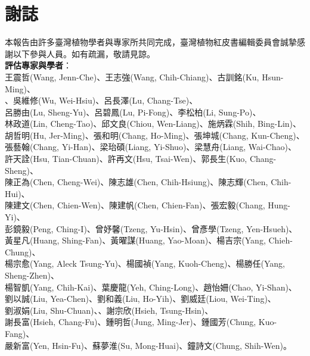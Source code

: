 \chapter{謝誌}

\linespread{1.1}\selectfont
\begin{Kai}
本報告由許多臺灣植物學者與專家所共同完成，臺灣植物紅皮書編輯委員會誠摯感謝以下參與人員。如有疏漏，敬請見諒。 \\

\noindent \textbf{評估專家與學者}：\\
\noindent 王震哲(Wang, Jenn-Che)、王志強(Wang, Chih-Chiang)、古訓銘(Ku, Hsun-Ming)、\\
、吳維修(Wu, Wei-Hsiu)、呂長澤(Lu, Chang-Tse)、\\
呂勝由(Lu, Sheng-Yu)、呂碧鳳(Lu, Pi-Fong)、李松柏(Li, Sung-Po)、\\
林政道(Lin, Cheng-Tao)、邱文良(Chiou, Wen-Liang)、施炳霖(Shih, Bing-Lin)、\\
胡哲明(Hu, Jer-Ming)、張和明(Chang, Ho-Ming)、張坤城(Chang, Kun-Cheng)、\\
張藝翰(Chang, Yi-Han)、梁珆碩(Liang, Yi-Shuo)、梁慧舟(Liang, Wai-Chao)、\\
許天詮(Hsu, Tian-Chuan)、許再文(Hsu, Tsai-Wen)、郭長生(Kuo, Chang-Sheng)、\\
陳正為(Chen, Cheng-Wei)、陳志雄(Chen, Chih-Hsiung)、陳志輝(Chen, Chih-Hui)、\\
陳建文(Chen, Chien-Wen)、陳建帆(Chen, Chien-Fan)、張宏毅(Chang, Hung-Yi)、\\
彭鏡毅(Peng, Ching-I)、曾妤馨(Tzeng, Yu-Hsin)、曾彥學(Tzeng, Yen-Hsueh)、\\
黃星凡(Huang, Shing-Fan)、黃曜謀(Huang, Yao-Moan)、楊吉宗(Yang, Chieh-Chung)、\\
楊宗愈(Yang, Aleck Tsung-Yu)、楊國禎(Yang, Kuoh-Cheng)、楊勝任(Yang, Sheng-Zhen)、\\
楊智凱(Yang, Chih-Kai)、葉慶龍(Yeh, Ching-Long)、趙怡姍(Chao, Yi-Shan)、\\
劉以誠(Liu, Yea-Chen)、劉和義(Liu, Ho-Yih)、劉威廷(Liou, Wei-Ting)、\\
劉淑娟(Liu, Shu-Chuan)、、謝宗欣(Hsieh, Tsung-Hsin)、\\
謝長富(Hsieh, Chang-Fu)、鍾明哲(Jung, Ming-Jer)、鍾國芳(Chung, Kuo-Fang)、\\
嚴新富(Yen, Hsin-Fu)、蘇夢淮(Su, Mong-Huai)、鐘詩文(Chung, Shih-Wen)。\\


\end{Kai}

